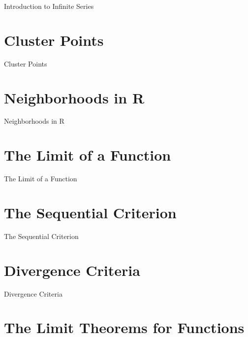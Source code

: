 Introduction to Infinite Series

\section{Cluster Points}
\label{sec:cluster-points}

Cluster Points

\section{Neighborhoods in R}
\label{sec:neighborhoods-in-r}

Neighborhoods in R

\section{The Limit of a Function}
\label{sec:the-limit-of-a-function}

The Limit of a Function

\section{The Sequential Criterion}
\label{sec:the-sequential-criterion}

The Sequential Criterion

\section{Divergence Criteria}
\label{sec:divergence-criteria}

Divergence Criteria

\section{The Limit Theorems for Functions}
\label{sec:the-limit-theorems-for-functions}

